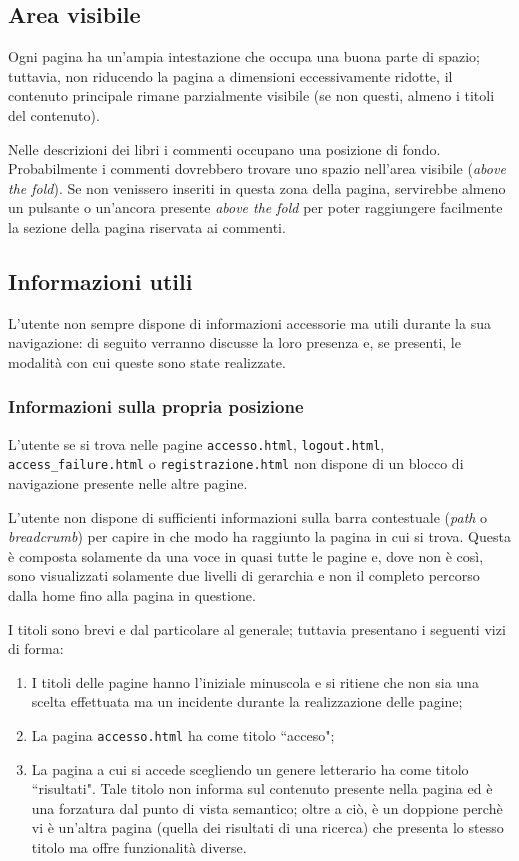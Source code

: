 \subsection{Area visibile}
Ogni pagina ha un'ampia intestazione che occupa una buona parte di spazio;
tuttavia, non riducendo la pagina a dimensioni eccessivamente ridotte, il
contenuto principale rimane parzialmente visibile (se non questi, almeno i
titoli del contenuto).

Nelle descrizioni dei libri i commenti occupano una posizione di fondo.
Probabilmente i commenti dovrebbero trovare uno spazio nell'area visibile
(\textit{above the fold}). Se non venissero inseriti in questa zona della
pagina, servirebbe almeno un pulsante o un'ancora presente \textit{above the
fold} per poter raggiungere facilmente la sezione della pagina riservata ai
commenti.

\subsection{Informazioni utili}
L'utente non sempre dispone di informazioni accessorie ma utili durante la sua
navigazione: di seguito verranno discusse la loro presenza e, se presenti, le
modalità con cui queste sono state realizzate.

\subsubsection{Informazioni sulla propria posizione}\label{sec:user-posiz}
L'utente se si trova nelle pagine \texttt{accesso.html}, \texttt{logout.html},
\texttt{access\_failure.html} o \texttt{registrazione.html} non dispone di un
blocco di navigazione presente nelle altre pagine.

L'utente non dispone di sufficienti informazioni sulla barra contestuale
(\textit{path} o \textit{breadcrumb}) per capire in che modo ha raggiunto la
pagina in cui si trova. Questa è composta solamente da una voce in quasi tutte
le pagine e, dove non è così, sono visualizzati solamente due livelli di
gerarchia e non il completo percorso dalla home fino alla pagina in questione.

I titoli sono brevi e dal particolare al generale; tuttavia presentano i
seguenti vizi di forma:
\begin{enumerate}
\item I titoli delle pagine hanno l'iniziale minuscola e si ritiene che non sia
una scelta effettuata ma un incidente durante la realizzazione delle pagine;
\item La pagina \texttt{accesso.html} ha come titolo ``acceso";
\item La pagina a cui si accede scegliendo un genere letterario ha come titolo
``risultati". Tale titolo non informa sul contenuto presente nella pagina ed è
una forzatura dal punto di vista semantico; oltre a ciò, è un doppione perchè
vi è un'altra pagina (quella dei risultati di una ricerca) che presenta lo
stesso titolo ma offre funzionalità diverse.
\end{enumerate}

